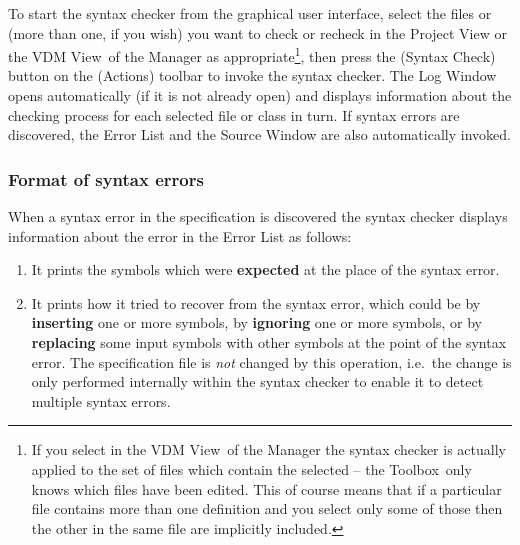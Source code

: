 \documentclass[\pformat,12pt]{article}
\newcommand{\Toolbox}{Toolbox}
\newcommand{\vdmModView}{\guicmd{VDM View}}
\newcommand{\guicmd}[1]{{\sf #1}}
\begin{document}
To start the syntax checker from the graphical user interface, select 
the files or  (more than
one, if you wish) you want to check or recheck in the \guicmd{Project
  View} or the \vdmModView\ of the \guicmd{Manager} as
appropriate\footnote{If you select 
   in the 
  \vdmModView\ of the \guicmd{Manager} the syntax checker is
  actually applied to the set of files which contain the selected
   -- the \Toolbox\ only
  knows which files have been edited. This of course means
  that if a particular file contains more than one
   definition and you 
  select only some of those 
  then the other  in the
  same file are implicitly included.}, then press the
(\guicmd{Syntax Check})
button on the (\guicmd{Actions})
toolbar to invoke the syntax checker. The \guicmd{Log Window} opens
automatically (if it is not already open) and displays information
about the checking process for each selected file or class in turn. If
syntax errors are discovered, the \guicmd{Error 
List} and the \guicmd{Source Window} are also 
au\-to\-matically invoked. 


\subsubsection{Format of syntax errors} \label{subsub:synerr}

When a syntax error in the specification is discovered the syntax
checker displays information about the
error in the \guicmd{Error List} as follows:


\begin{enumerate}

\item It prints the symbols which were \textbf{expected} at the place
  of the syntax error.

\item It prints how it tried to recover from the syntax error, which
  could be by \textbf{inserting} one or more symbols, by
  \textbf{ignoring} one or more symbols, or by \textbf{replacing} 
  some input symbols with other symbols at the point of the syntax
  error. The specification file is {\em not\/} changed by this
  operation, i.e.\ the change is only performed internally within the
  syntax checker to enable it to detect multiple syntax errors.


\end{enumerate}
\end{document}
